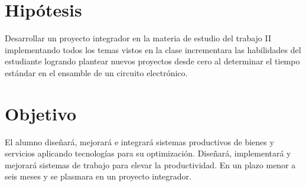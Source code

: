     
    \section{Hipótesis}
    Desarrollar un proyecto integrador en la materia de
    estudio del trabajo II implementando todos los temas
    vistos en la clase incrementara las habilidades del estudiante logrando plantear nuevos proyectos desde cero al
    determinar el tiempo estándar en el ensamble de un circuito electrónico.
    
    \section{Objetivo}
    
    El alumno diseñará, mejorará e integrará sistemas productivos de bienes y servicios aplicando tecnologías para su optimización.
    Diseñará, implementará y mejorará sistemas de trabajo para elevar la productividad.
    En un plazo menor a seis meses y se plasmara en un proyecto integrador.
    
    
